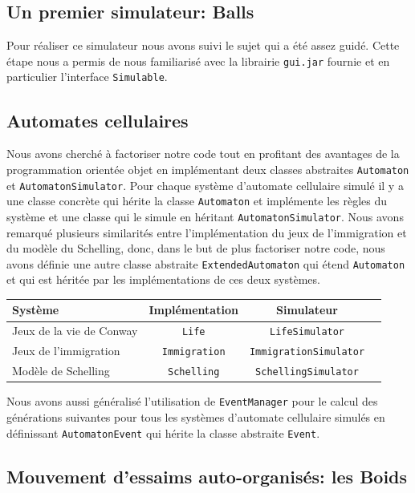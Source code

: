 \documentclass [a4paper,11pt,titlepage] {article}
\begin{document}
\subsection{Un premier simulateur: Balls}
Pour réaliser ce simulateur nous avons suivi le sujet qui a été assez guidé. Cette étape nous a permis de nous familiarisé avec la librairie \texttt{gui.jar} fournie et en particulier l'interface \texttt{Simulable}.
\subsection{Automates cellulaires}
Nous avons cherché à factoriser notre code tout en profitant des avantages de la programmation orientée objet en implémentant deux classes abstraites \texttt{Automaton} et \texttt{AutomatonSimulator}. Pour chaque système d'automate cellulaire simulé il y a une classe concrète qui hérite la classe \texttt{Automaton} et implémente les règles du système et une classe qui le simule en héritant \texttt{AutomatonSimulator}. Nous avons remarqué plusieurs similarités entre l'implémentation du jeux de l'immigration et du modèle du Schelling, donc, dans le but de plus factoriser notre code, nous avons définie une autre classe abstraite \texttt{ExtendedAutomaton} qui étend \texttt{Automaton} et qui est héritée par les implémentations de ces deux systèmes.

\begin{center}
\begin{tabular}{|l|c|c|c|}
  \hline
    Système & Implémentation & Simulateur \\
  \hline
   Jeux de la vie de Conway & \texttt{Life} & \texttt{LifeSimulator}\\
  \hline
  Jeux de l'immigration & \texttt{Immigration} & \texttt{ImmigrationSimulator}\\
  \hline
  Modèle de Schelling & \texttt{Schelling} & \texttt{SchellingSimulator}\\
  \hline
 
\end{tabular}
\end{center}

Nous avons aussi généralisé l'utilisation de \texttt{EventManager} pour le calcul des générations suivantes pour tous les systèmes d'automate cellulaire simulés en définissant \texttt{AutomatonEvent} qui hérite la classe abstraite \texttt{Event}.


\subsection{Mouvement d’essaims auto-organisés: les Boids}
\end{document}
